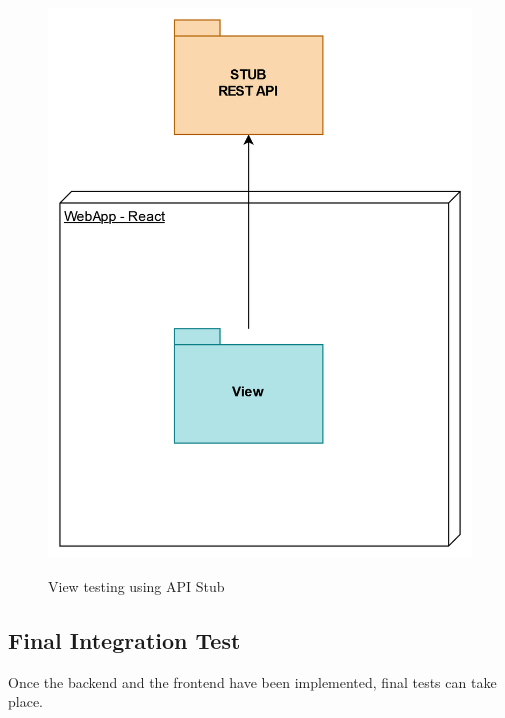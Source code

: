 \documentclass{Configuration_Files/Template}
\begin{document}
\begin{figure}[H]
\centering
\includegraphics[scale = 0.55]{DD_latex/Images/diagrams/ImplementationPlan_CS.png}\\
\caption{View testing using API Stub}
\end{figure}

\subsection{Final Integration Test}

Once the backend and the frontend have been implemented, final tests can take place.
\end{document}

